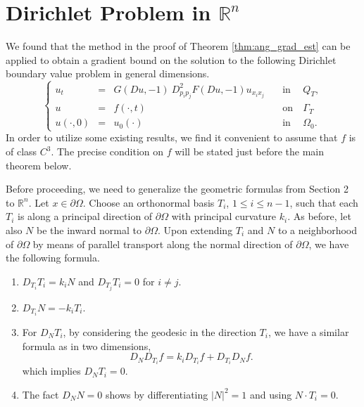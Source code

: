 \documentclass[12pt]{article}
\numberwithin{equation}{section}
\theoremstyle{plain}
\theoremstyle{definition}
\theoremstyle{remark}
\begin{document}
\section{Dirichlet Problem in $\mathbb{R}^n$}
We found that the method in the proof of Theorem \ref{thm:ang_grad_est} can be applied to obtain a gradient bound on the solution to the following Dirichlet boundary value problem in general dimensions.
\begin{equation} \label{eq:diri_pro}
    \left\{ \begin{array}{cllcl}
            u_t  &=& G(Du,-1) \  D^2_{p_i p_j} F (Du,-1) u_{x_i x_j}   \quad &  \text{in} & \ Q_T, \\
            u &=& f(\cdot,t)  \quad &  \text{on} & \ \Gamma_T  \\
         u(\cdot,0) &=& u_0(\cdot)  \quad \ & \text{in} & \   \Omega_0.
    \end{array}  \right.
\end{equation}
In order to utilize some existing results, we find it convenient to assume that
$f$ is of class $C^3$. The precise condition on $f$ will be stated just before the main theorem below.

Before proceeding, we need to generalize the geometric formulas from Section 2 to $\mathbb{R}^n$. 
Let $x\in \partial\Omega$. Choose an orthonormal basis $T_i$, $1\leq i\leq n-1$, such that each $T_i$ is along a principal direction of $\partial\Omega$ with principal 
curvature $k_i$. As before, let also $N$ be the inward normal to $\partial \Omega$.
Upon extending $T_i$ and $N$ to a neighborhood of $\partial\Omega$ by means of parallel transport along the normal direction of $\partial\Omega$, we have the following formula.
\begin{enumerate}
    \item $D_{T_i} T_i= k_i N $ and $D_{T_j} T_i= 0 $ for $i\neq j$. 
    
    \item $D_{T_i} N = -k_i T_i$.  

\item 
For $D_N T_i$, by considering the geodesic in the direction $T_i$, we have a similar formula as in two dimensions,
\begin{equation} 
    D_N D_{T_i} f = k_i D_{T_i} f + D_{T_i} D_N f.
 \end{equation}
 which implies $D_N T_i = 0$.
 
\item The fact $D_N N = 0$ shows by differentiating $|N|^2=1$ and using $N\cdot T_i =0 $. 
\end{enumerate}
\end{document}
